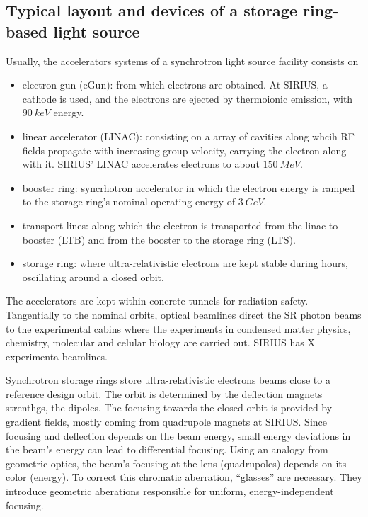 
\subsection{Typical layout and devices of a storage ring-based light source}
Usually, the accelerators systems of a synchrotron light source facility consists on
\begin{itemize}
    \item electron gun (eGun): from which electrons are obtained. At SIRIUS, a cathode is used, and the electrons are ejected by thermoionic emission, with $90~\unit{keV}$ energy.
    \item linear accelerator (LINAC): consisting on a array of cavities along whcih RF fields propagate with increasing group velocity, carrying the electron along with it. SIRIUS' LINAC accelerates electrons to about $150~\unit{MeV}$.
    \item booster ring: syncrhotron accelerator in which the electron energy is ramped to the storage ring's nominal operating energy of $3~\unit{GeV}$.
    \item transport lines: along which the electron is transported from the linac to booster (LTB) and from the booster to the storage ring (LTS).
    \item storage ring: where ultra-relativistic electrons are kept stable during hours, oscillating around a closed orbit.
\end{itemize}
The accelerators  are kept within concrete tunnels for radiation safety. Tangentially to the nominal orbits, optical beamlines direct the SR photon beams to the experimental cabins where the experiments in condensed matter physics, chemistry, molecular and celular biology are carried out. SIRIUS has X experimenta beamlines.

Synchrotron storage rings store ultra-relativistic electrons beams close to a reference design orbit. The orbit is determined by the deflection magnets strenthgs, the dipoles. The focusing towards the closed orbit is provided by gradient fields, mostly coming from quadrupole magnets at SIRIUS. Since focusing and deflection depends on the beam energy, small energy deviations in the beam's energy can lead to differential focusing. Using an analogy from geometric optics, the beam's focusing at the lens (quadrupoles) depends on its color (energy). To correct this chromatic aberration, ``glasses'' are necessary. They introduce geometric aberations responsible for uniform, energy-independent focusing.


